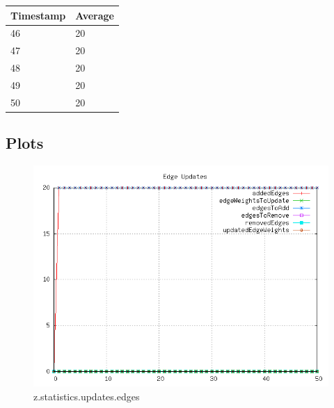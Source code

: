 \begin{tabular}{|l||l|}
\hline
	\textbf{Timestamp} & \textbf{Average} \\ \hline
	46 & 20 \\ \hline
	47 & 20 \\ \hline
	48 & 20 \\ \hline
	49 & 20 \\ \hline
	50 & 20 \\ \hline
\end{tabular}

\subsection{Plots}

\begin{figure} [h]
	\centering
	\includegraphics [scale=0.8] {plots/z.statistics.updates.edges}
	\caption{z.statistics.updates.edges}
	\label{plot:RANDOM_100_500 - BARABASI_ALBERT_GROWTH_10_2.z.statistics.updates.edges}
\end{figure}

